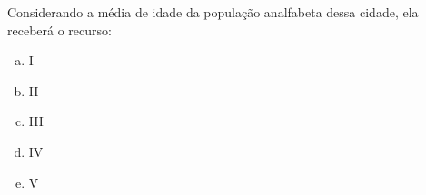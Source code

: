 \documentclass[a4paper,14pt]{article}
\begin{document}
\begin{enumerate}
\begin{multicols}{2}
		Considerando a média de idade da população analfabeta dessa cidade, ela receberá o recurso:
		\begin{enumerate}[a)]
			\item I
			\item II
			\item III
			\item IV
			\item V
		\end{enumerate}
	$~$ \\ $~$ \\ $~$ \\ $~$ \\ $~$ \\ $~$ \\ $~$ \\ $~$ \\ $~$ \\ $~$ \\ $~$ \\ $~$ \\ $~$ \\ $~$ \\ $~$ \\ $~$ \\ $~$ \\ $~$ \\ $~$ \\ $~$ \\ $~$ \\ $~$ \\$~$ \\ $~$ \\ $~$ \\ $~$ \\ $~$ \\ $~$ \\ $~$ \\ $~$ \\ $~$ \\ $~$ \\ $~$ \\ $~$ \\ $~$ \\ $~$ \\ $~$ \\ $~$ \\ $~$ \\ $~$ \\ $~$ \\ $~$ \\ $~$ \\ $~$ \\$~$ \\ $~$ \\ $~$ \\ $~$ \\ $~$ \\ $~$ \\ $~$
    \end{multicols}
	\end{enumerate}
\end{document}
